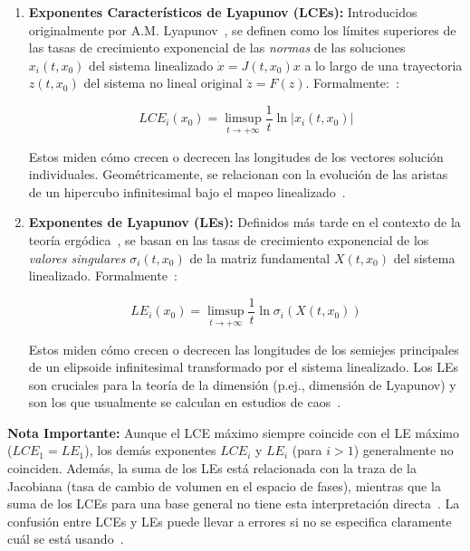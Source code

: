 \begin{enumerate}
    \item \textbf{Exponentes Característicos de Lyapunov (LCEs):} Introducidos originalmente por A.M. Lyapunov~\cite{Lyapunov1992}, se definen como los límites superiores de las tasas de crecimiento exponencial de las \textit{normas} de las soluciones $x_i(t, x_0)$ del sistema linealizado $\dot{x} = J(t, x_0)x$ a lo largo de una trayectoria $z(t, x_0)$ del sistema no lineal original $\dot{z} = F(z)$. Formalmente:~\cite{Kuznetsov2005, Kuznetsov2016}:
    
    \begin{equation}
        LCE_i(x_0) = \limsup_{t \to +\infty} \frac{1}{t} \ln |x_i(t, x_0)|
    \end{equation}
    
    Estos miden cómo crecen o decrecen las longitudes de los vectores solución individuales. Geométricamente, se relacionan con la evolución de las aristas de un hipercubo infinitesimal bajo el mapeo linealizado~\cite{Kuznetsov2016}.

    \item \textbf{Exponentes de Lyapunov (LEs):} Definidos más tarde en el contexto de la teoría ergódica~\cite{Oseledec1968}, se basan en las tasas de crecimiento exponencial de los \textit{valores singulares} $\sigma_i(t, x_0)$ de la matriz fundamental $X(t, x_0)$ del sistema linealizado. Formalmente~\cite{Kuznetsov2016}:
    
    \begin{equation}
        LE_i(x_0) = \limsup_{t \to +\infty} \frac{1}{t} \ln \sigma_i(X(t, x_0))
    \end{equation}
    
    Estos miden cómo crecen o decrecen las longitudes de los semiejes principales de un elipsoide infinitesimal transformado por el sistema linealizado. Los LEs son cruciales para la teoría de la dimensión (p.ej., dimensión de Lyapunov) y son los que usualmente se calculan en estudios de caos~\cite{Kuznetsov2016}.
\end{enumerate}

\textbf{Nota Importante:} Aunque el LCE máximo siempre coincide con el LE máximo ($LCE_1 = LE_1$), los demás exponentes $LCE_i$ y $LE_i$ (para $i > 1$) generalmente no coinciden. Además, la suma de los LEs está relacionada con la traza de la Jacobiana (tasa de cambio de volumen en el espacio de fases), mientras que la suma de los LCEs para una base general no tiene esta interpretación directa~\cite{Kuznetsov2016}. La confusión entre LCEs y LEs puede llevar a errores si no se especifica claramente cuál se está usando~\cite{Cvitanovic2012}.

